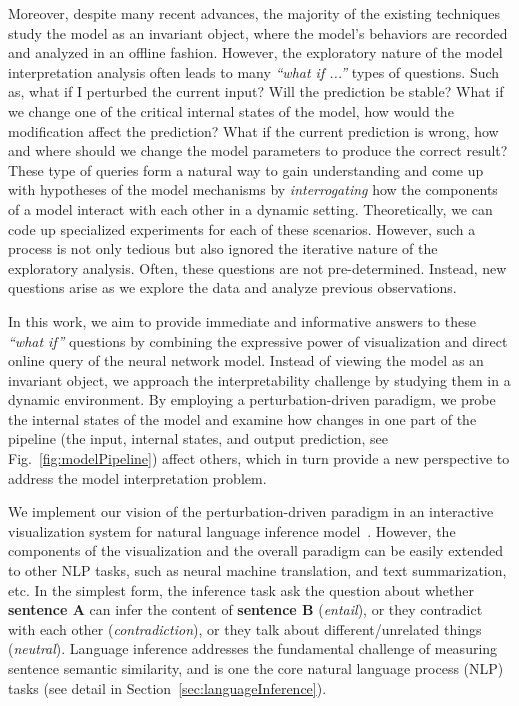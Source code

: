 Moreover, despite many recent advances, the majority of the existing techniques study the model as an invariant object, where the model's behaviors are recorded and analyzed in an offline fashion.
%
However, the exploratory nature of the model interpretation analysis often leads to many \emph{``what if ...''} types of questions. Such as, what if I perturbed the current input? Will the prediction be stable? What if we change one of the critical internal states of the model, how would the modification affect the prediction? What if the current prediction is wrong, how and where should we change the model parameters to produce the correct result? These type of queries form a natural way to gain understanding and come up with hypotheses of the model mechanisms by \emph{interrogating} how the components of a model interact with each other in a dynamic setting. Theoretically, we can code up specialized experiments for each of these scenarios. However, such a process is not only tedious but also ignored the iterative nature of the exploratory analysis. Often, these questions are not pre-determined. Instead, new questions arise as we explore the data and analyze previous observations.

In this work, we aim to provide immediate and informative answers to these \emph{``what if''} questions by combining the expressive power of visualization and direct online query of the neural network model. Instead of viewing the model as an invariant object, we approach the interpretability challenge by studying them in a dynamic environment. By employing a perturbation-driven paradigm, we probe the internal states of the model and examine how changes in one part of the pipeline (the input, internal states, and output prediction, see Fig.~\ref{fig:modelPipeline}) affect others, which in turn provide a new perspective to address the model interpretation problem.

We implement our vision of the perturbation-driven paradigm in an interactive visualization system for natural language inference model~\cite{Parikh2016}.
%
However, the components of the visualization and the overall paradigm can be easily extended to other NLP tasks, such as neural machine translation, and text summarization, etc.
%
In the simplest form, the inference task ask the question about whether \textbf{sentence A} can infer the content of \textbf{sentence B} (\emph{entail}), or they contradict with each other (\emph{contradiction}), or they talk about different/unrelated things (\emph{neutral}). Language inference addresses the fundamental challenge of measuring sentence semantic similarity, and is one the core natural language process (NLP) tasks (see detail in Section~\ref{sec:languageInference}).

